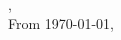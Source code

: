 \begin{frame}
{ \LARGE \bf \Title\\}
\small
\vfill
\noindent \hspace*{-1em} \Faculty  \vfill
\noindent                \Where,\\   %
\noindent                \Dates    \vfill
\noindent \vspace*{ 1em} \Homepage \hfill \vfill
\tiny From \texttt{\currfileabspath} \hfill \today, \currenttime
\end{frame}

\title{\Title}
\author{Bendix Carstensen}
